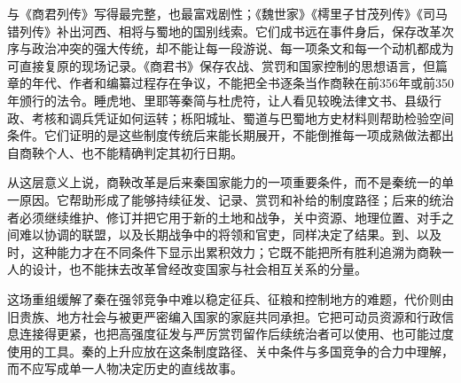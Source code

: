 \begin{sourcenote}[从商鞅故事回到材料边界]
与《商君列传》写得最完整，也最富戏剧性；《魏世家》《樗里子甘茂列传》《司马错列传》补出河西、相将与蜀地的国别线索。它们成书远在事件身后，保存改革次序与政治冲突的强大传统，却不能让每一段游说、每一项条文和每一个动机都成为可直接复原的现场记录。《商君书》保存农战、赏罚和国家控制的思想语言，但篇章的年代、作者和编纂过程存在争议，不能把全书逐条当作商鞅在前356年或前350年颁行的法令。睡虎地、里耶等秦简与杜虎符，让人看见较晚法律文书、县级行政、考核和调兵凭证如何运转；栎阳城址、蜀道与巴蜀地方史材料则帮助检验空间条件。它们证明的是这些制度传统后来能长期展开，不能倒推每一项成熟做法都出自商鞅个人、也不能精确判定其初行日期。
\end{sourcenote}

从这层意义上说，商鞅改革是后来秦国家能力的一项重要条件，而不是秦统一的单一原因。它帮助形成了能够持续征发、记录、赏罚和补给的制度路径；后来的统治者必须继续维护、修订并把它用于新的土地和战争，关中资源、地理位置、对手之间难以协调的联盟，以及长期战争中的将领和官吏，同样决定了结果。到、以及时，这种能力才在不同条件下显示出累积效力；它既不能把所有胜利追溯为商鞅一人的设计，也不能抹去改革曾经改变国家与社会相互关系的分量。

\begin{turningpoint}
这场重组缓解了秦在强邻竞争中难以稳定征兵、征粮和控制地方的难题，代价则由旧贵族、地方社会与被更严密编入国家的家庭共同承担。它把可动员资源和行政信息连接得更紧，也把高强度征发与严厉赏罚留作后续统治者可以使用、也可能过度使用的工具。秦的上升应放在这条制度路径、关中条件与多国竞争的合力中理解，而不应写成单一人物决定历史的直线故事。
\end{turningpoint}
